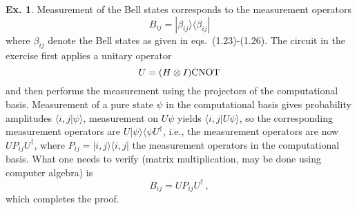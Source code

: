 \documentclass[a4paper,12pt]{article}
\theoremstyle{definition}
\newtheorem{exercise}{Ex.}[section]
\begin{document}
\begin{exercise}
 Measurement of the Bell states corresponds to the measurement operators
 \[
  B_{ij} = |\beta_{ij}\rangle\langle \beta_{ij}|
 \]
 where $\beta_{ij}$ denote the Bell states as given in eqs.\ (1.23)-(1.26). The circuit in the exercise first applies a unitary operator
 \[
  U = (H\otimes I) {\rm CNOT}
 \]
 and then performs the measurement using the projectors of the computational basis. Measurement of a pure state $\psi$ in the computational basis gives probability amplitudes $\langle i,j|\psi\rangle$, measurement on $U\psi$ yields
 $\langle i,j| U\psi\rangle$, so the corresponding measurement operators are $U|\psi\rangle \langle \psi U^\dagger$, i.e., the measurement operators are now $UP_{ij}U^\dagger$, where $P_{ij}=|i,j\rangle\langle i,j |$ the measurement operators in the computational basis. What one needs to verify (matrix multiplication, may be done using computer algebra) is
 \[
  B_{ij} = U P_{ij} U^\dagger\,,
 \]
 which completes the proof.
\end{exercise}
\end{document}
